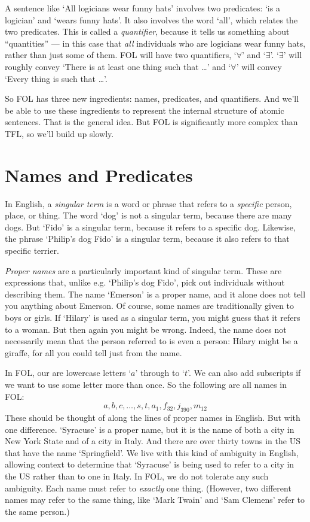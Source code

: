 A sentence like `All logicians wear funny hats' involves two predicates: `\blank is a logician' and `\blank wears funny hats'.  It also involves the word `all', which relates the two predicates.  This is called a \emph{quantifier}, because it tells us something about ``quantities'' --- in this case that \emph{all} individuals who are logicians wear funny hats, rather than just some of them.  FOL will have two quantifiers, `$\forall$' and `$\exists$'.  `$\exists$' will roughly convey `There is at least one thing such that \ldots' and `$\forall$' will convey `Every thing is such that \ldots'.

So FOL has three new ingredients: names, predicates, and quantifiers.  And we'll be able to use these ingredients to represent the internal structure of atomic sentences. That is the general idea. But FOL is significantly more complex than TFL, so we'll build up slowly.


\section{Names and Predicates}\label{s:NamesPredicates}
In English, a \emph{singular term} is a word or phrase that refers to a \emph{specific} person, place, or thing. The word `dog' is not a singular term, because there are many dogs. But `Fido' is a singular term, because it refers to a specific dog. Likewise, the phrase `Philip's dog Fido' is a singular term, because it also refers to that specific terrier.

\emph{Proper names} are a particularly important kind of singular term. These are expressions that, unlike e.g. `Philip's dog Fido', pick out individuals without describing them. The name `Emerson' is a proper name, and it alone does not tell you anything about Emerson. Of course, some names are traditionally given to boys or girls. If `Hilary' is used as a singular term, you might guess that it refers to a woman. But then again you might be wrong. Indeed, the name does not necessarily mean that the person referred to is even a person: Hilary might be a giraffe, for all you could tell just from the name.

In FOL, our  are lowercase letters `$a$' through to `$t$'. We can also add subscripts if we want to use some letter more than once. So the following are all names in FOL:
	$$a,b,c,\ldots , s, t, a_1, f_{32}, j_{390}, m_{12}$$
These should be thought of along the lines of proper names in English. But with one difference. `Syracuse' is a proper name, but it is the name of both a city in New York State and of a city in Italy.  And there are over thirty towns in the US that have the name `Springfield'.   We live with this kind of ambiguity in English, allowing context to determine that `Syracuse' is being used to refer to a city in the US rather than to one in Italy. In FOL, we do not tolerate any such ambiguity. Each name must refer to \emph{exactly} one thing. (However, two different names may refer to the same thing, like `Mark Twain' and `Sam Clemens' refer to the same person.)


